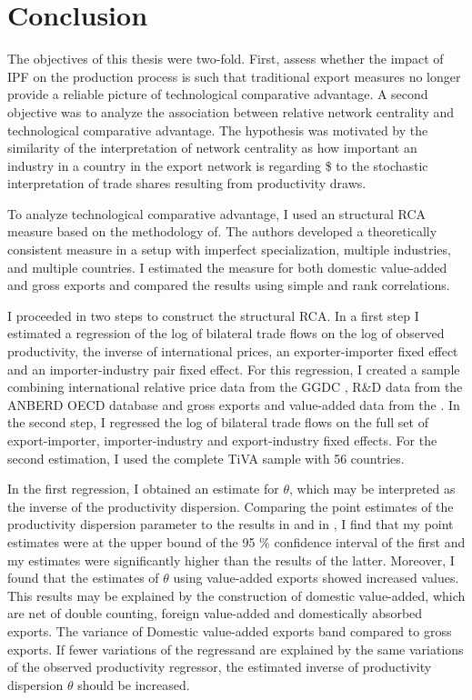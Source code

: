 \chapter{Conclusion}
The objectives of this thesis were two-fold. First, assess whether the impact of IPF on the production process is such that traditional export measures no longer provide a reliable picture of technological comparative advantage. A second objective was to analyze the association between relative network centrality and technological comparative advantage. The hypothesis was motivated by the similarity of the interpretation of network centrality as how important an industry in a country in the export network is regarding \$ to the stochastic interpretation of trade shares resulting from productivity draws. \par
To analyze technological comparative advantage, I used an structural RCA measure based on the methodology of\textcite{costinot}. The authors developed a theoretically consistent measure in a setup with imperfect specialization, multiple industries, and multiple countries. I estimated the measure for both domestic value-added and gross exports and compared the results using simple and rank correlations. \par 
I proceeded in two steps to construct the structural RCA. In a first step I estimated a regression of the log of bilateral trade flows on the log of observed productivity, the inverse of international prices, an exporter-importer fixed effect and an importer-industry pair fixed effect. For this regression, I created a sample combining international relative price data from the GGDC \textcite{Inklaar2012}, R\&D data from the ANBERD OECD database and gross exports and value-added data from the \textcite{tiva2}.  In the second step, I regressed the log of bilateral trade flows on the full set of export-importer, importer-industry and export-industry fixed effects.  For the second estimation, I used the complete TiVA sample with 56 countries.  \par 
In the first regression, I obtained an estimate for $\theta$, which may be interpreted as the inverse of the productivity dispersion. Comparing the point estimates of the productivity dispersion parameter to the results in \textcite{eaton} and in \textcite{costinot}, I find that my point estimates were at the upper bound of the 95 \% confidence interval of the first and my estimates were significantly higher than the results of the latter. Moreover, I found that the estimates of $\theta$ using value-added exports showed increased values. This results may be explained by the construction of domestic value-added, which are net of double counting, foreign value-added and domestically absorbed exports.  The variance of Domestic value-added exports band compared to gross exports. If fewer variations of the regressand are explained by the same variations of the observed productivity regressor, the estimated inverse of productivity dispersion $\theta$ should be increased.  \par
